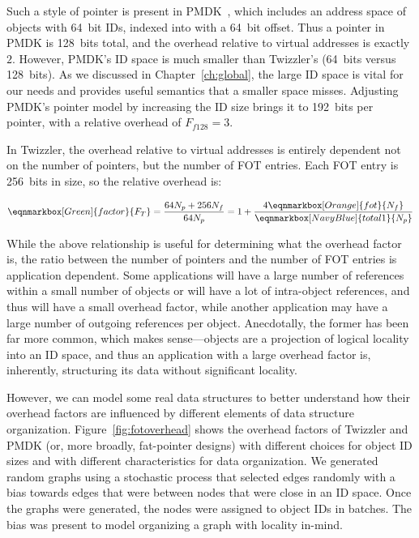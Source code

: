 Such a style of pointer is present in PMDK~\cite{pmdk-pointers}, which includes an address space of
objects with 64~bit IDs, indexed into with a 64~bit offset. Thus a pointer in PMDK is 128~bits
total, and the overhead relative to virtual addresses is exactly $2$. However, PMDK's ID space is much
smaller than Twizzler's (64~bits versus 128~bits). As we discussed in Chapter~\ref{ch:global}, the
large ID space is vital for our needs and provides useful semantics that a smaller space misses.
Adjusting PMDK's pointer model by increasing the ID size brings it to 192~bits per pointer, with a
relative overhead of $F_{f128} = 3$.

In Twizzler, the overhead relative to virtual addresses is entirely dependent not on the number of
pointers, but the number of FOT entries. Each FOT entry is 256~bits in size, so the relative
overhead is:

\begin{equation*}
    \eqnmarkbox[Green]{factor}{F_T}
    = \frac{64
        N_p
        + 256
        N_f
    }{64
        N_p
    }
    = 1 + \frac{4
        \eqnmarkbox[Orange]{fot}{N_f}
    }{
        \eqnmarkbox[NavyBlue]{total1}{N_p}
    }
\end{equation*}


While the above relationship is useful for determining what the overhead factor is, the ratio
between the number of pointers and the number of FOT entries is application dependent. Some
applications will have a large number of references within a small number of objects or will have a
lot of intra-object references, and thus will have a small overhead factor, while another
application may have a large number of outgoing references per object. Anecdotally, the former has
been far more common, which makes sense---objects are a projection of logical locality into an ID
space, and thus an application with a large overhead factor is, inherently, structuring its data
without significant locality.

However, we can model some real data structures to better understand how their overhead factors are
influenced by different elements of data structure organization. Figure~\ref{fig:fotoverhead} shows
the overhead factors of Twizzler and PMDK (or, more broadly, fat-pointer designs) with different
choices for object ID sizes and with different characteristics for data organization. We generated
random graphs using a stochastic process that selected edges randomly with a bias towards edges that
were between nodes that were close in an ID space. Once the graphs were generated, the nodes were
assigned to object IDs in batches. The bias was present to model organizing a graph with locality
in-mind.

